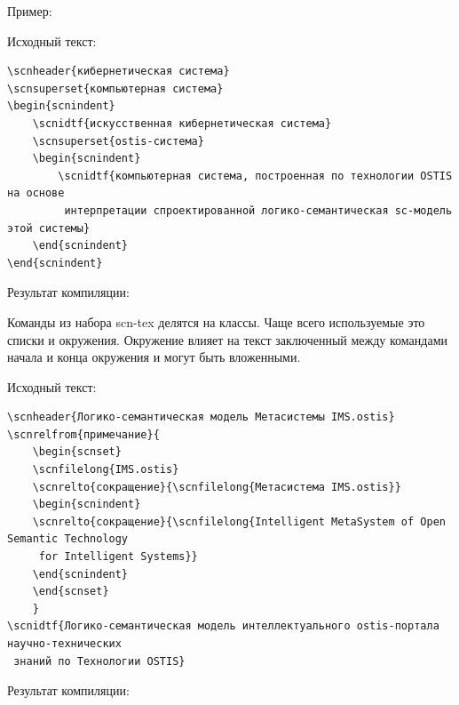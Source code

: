 Пример:

Исходный текст:

\begin{verbatim}
\scnheader{кибернетическая система}
\scnsuperset{компьютерная система}
\begin{scnindent}
    \scnidtf{искусственная кибернетическая система}
    \scnsuperset{ostis-система}
    \begin{scnindent}
        \scnidtf{компьютерная система, построенная по технологии OSTIS на основе
		 интерпретации спроектированной логико-семантическая sc-модель этой системы}
    \end{scnindent}
\end{scnindent}
\end{verbatim}


Результат компиляции:

\begin{scnindent}
    \begin{scnindent}
    \end{scnindent}
\end{scnindent}


Команды из набора scn-tex делятся на классы. Чаще всего используемые это списки и окружения. Окружение влияет на текст заключенный между командами начала и конца окружения и могут быть вложенными. 


Исходный текст:


\begin{verbatim}
\scnheader{Логико-семантическая модель Метасистемы IMS.ostis}
\scnrelfrom{примечание}{
	\begin{scnset}
	\scnfilelong{IMS.ostis}
	\scnrelto{сокращение}{\scnfilelong{Метасистема IMS.ostis}}
	\begin{scnindent}
	\scnrelto{сокращение}{\scnfilelong{Intelligent MetaSystem of Open Semantic Technology
	 for Intelligent Systems}}
	\end{scnindent}
	\end{scnset}
	}
\scnidtf{Логико-семантическая модель интеллектуального ostis-портала научно-технических
 знаний по Технологии OSTIS}
\end{verbatim}


Результат компиляции:


